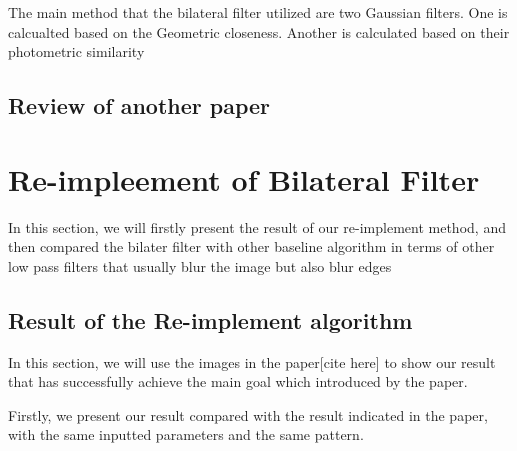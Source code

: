 \documentclass[12pt]{article}
\begin{document}
The main method that the bilateral filter utilized are two Gaussian filters. 
One is calcualted based on the Geometric closeness. 
Another is calculated based on their photometric similarity



\subsection{Review of another paper}


\section{Re-impleement of Bilateral Filter}
In this section, we will firstly present the result of our re-implement method, and then compared the bilater filter with other baseline algorithm in terms of other low pass filters that usually blur the image but also blur edges


\subsection{Result of the Re-implement algorithm}
In this section, we will use the images in the paper[cite here] to show our result that has successfully achieve the main goal which introduced by the paper.

Firstly, we present our result compared with the result indicated in the paper, with the same inputted parameters and the same pattern.
\end{document}
